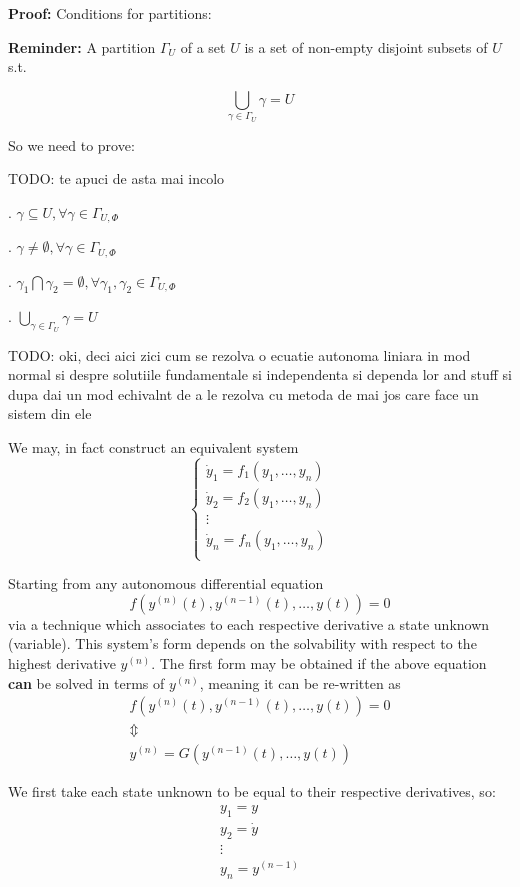 \textbf{Proof:}
Conditions for partitions:
\par \textbf{Reminder:} A partition $\Gamma_U$ of a set $U$ is a set of non-empty disjoint subsets of $U$ s.t.

\[
  \bigcup_{\gamma\in \Gamma_U} \gamma = U
\]

So we need to prove:

TODO: te apuci de asta mai incolo \par
{}. $\gamma \subseteq U, \forall \gamma \in \Gamma_{U,\Phi}$ \par
{}. $ \gamma \neq \emptyset, \forall \gamma \in \Gamma_{U,\Phi}$ \par
{}. $\gamma_1 \bigcap \gamma_2 = \emptyset, \forall \gamma_1, \gamma_2 \in \Gamma_{U,\Phi}$ \par
{}. $\bigcup_{\gamma\in \Gamma_U} \gamma = U$ \par

TODO: oki, deci aici zici cum se rezolva o ecuatie autonoma liniara in mod normal si despre solutiile fundamentale si independenta si dependa lor and stuff si dupa dai un mod echivalnt de a le rezolva cu metoda de mai jos care face un sistem din ele

We may, in fact construct an equivalent system
\[
  \begin{cases}
    \dot{y}_1 = f_1(y_1,\dots, y_n) \\
    \dot{y}_2 = f_2(y_1,\dots, y_n) \\
    \vdots                          \\
    \dot{y}_n = f_n(y_1,\dots, y_n) \\
  \end{cases}
\]

Starting from any autonomous differential equation
\[
  f(y^{(n)}(t), y^{(n-1)}(t), \dots, y(t))= 0
\]
via a technique which associates to each respective derivative a state unknown (variable).
This system's form depends on the solvability with respect to the highest derivative $y^{(n)}$.
The first form may be obtained if the above equation \textbf{can} be solved in terms of $y^{(n)}$, meaning it can be re-written as
\begin{gather*}
  f(y^{(n)}(t), y^{(n-1)}(t), \dots, y(t))= 0 \\
  \Updownarrow \\
  y^{(n)}  = G(y^{(n-1)}(t), \dots, y(t))
\end{gather*}

We first take each state unknown to be equal to their respective derivatives, so:
\begin{gather*}
  y_1 = y     \\
  y_2 = \dot{y} \\
  \vdots \\
  y_n = y^{(n-1)}
\end{gather*}

